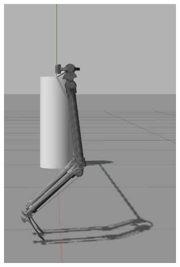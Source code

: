 \begin{figure}[h]
\begin{subfigure}{.19\textwidth}
    \includegraphics[width=\linewidth]{figures/gazebo_jumping_2.png}
  \end{subfigure}
  \begin{subfigure}{.19\textwidth}

\end{subfigure}
\end{figure}
